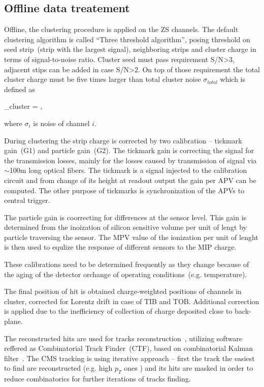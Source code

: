 \subsection{Offline data treatement}

Offline, the clustering procedure is applied on the ZS channels. The default clustering algorithm is called ``Three threshold algorithm'', posing threshold on seed strip~(strip with the largest signal), neighboring strips and cluster charge in terms of signal-to-noise ratio. Cluster seed must pass requirement S/N>3, adjacent stips can be added in case S/N>2. On top of those requirement the total cluster charge must be five times larger than total cluster noise $\sigma_{total}$ which is defined as

{
    \sigma_{cluster} = ,
}

where $\sigma_{i}$ is noise of channel $i$.

During clustering the strip charge is corrected by two calibration -- tickmark gain~(G1) and particle gain~(G2). The tickmark gain is correcting the signal for the transmission losses, mainly for the losses caused by transmission of signal via $\sim$100m long optical fibers. The tickmark is a signal injected to the calibration circuit and from change of its height at readout output the gain per APV can be computed. The other purpose of tickmarks is synchronization of the APVs to central trigger.

The particle gain is coorrecting for differences at the sensor level. This gain is determined from the inoization of silicon sensitive volume per unit of lengt by particle traversing the sensor. The MPV value of the ionization per unit of lenght is then used to equlize the response of different sensors to the MIP charge. 

These calibrations need to be determined frequently as they change because of the aging of the detector orchange of operating conditions~(e.g. temperature).


The final position of hit is obtained charge-weighted positions of channels in cluster, corrected for Lorentz drift in case of TIB and TOB. Additional correction is applied due to the inefficiency of collection of charge deposited close to back-plane.

The reconstructed hits are used for tracks reconstruction~\cite{Chatrchyan:2014fea}, utilizing software reffered as Combinatorial Track Finder~(CTF), based on combinatorial Kalman filter~\cite{Fruhwirth:1987fm}. The CMS tracking is using iterative approach -- first the track the easiest to find are reconstructed (e.g. high $p_{T}$ ones ) and its hits are masked in order to reduce combinatorics for further iterations of tracks finding.


